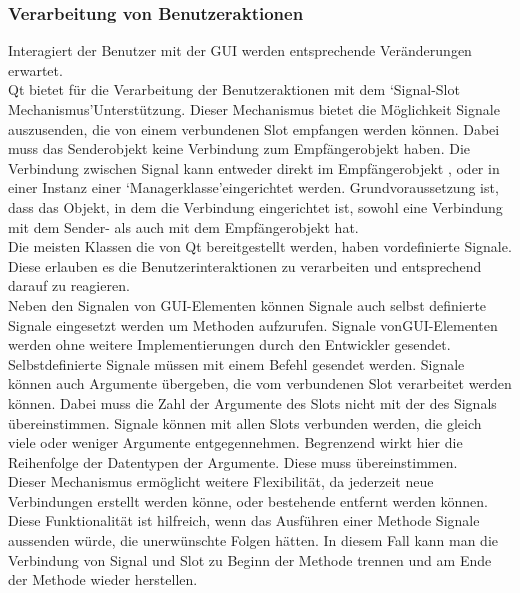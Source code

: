 \documentclass[12pt,a4paper]{article}
\begin{document}
\subsubsection{Verarbeitung von Benutzeraktionen}
Interagiert der Benutzer mit der \ac{GUI} werden entsprechende Veränderungen erwartet. \\
Qt bietet für die Verarbeitung der Benutzeraktionen mit dem \lq Signal-Slot Mechanismus\rq\space Unterstützung. Dieser Mechanismus bietet die Möglichkeit Signale auszusenden, die von einem verbundenen Slot empfangen werden können. Dabei muss das Senderobjekt keine Verbindung zum Empfängerobjekt haben. Die Verbindung zwischen Signal kann entweder direkt im Empfängerobjekt , oder in einer Instanz einer \lq Managerklasse\rq\space eingerichtet werden. Grundvoraussetzung ist, dass das Objekt, in dem die Verbindung eingerichtet ist, sowohl eine Verbindung mit dem Sender- als auch mit dem Empfängerobjekt hat.\\
Die meisten Klassen die von Qt bereitgestellt werden, haben vordefinierte Signale. Diese erlauben es die Benutzerinteraktionen zu verarbeiten und entsprechend darauf zu reagieren. \\
Neben den Signalen von \ac{GUI}-Elementen können Signale auch selbst definierte Signale eingesetzt werden um Methoden aufzurufen. Signale von\ac{GUI}-Elementen werden ohne weitere Implementierungen durch den Entwickler gesendet. Selbstdefinierte Signale müssen mit einem Befehl gesendet werden. Signale können auch Argumente übergeben, die vom verbundenen Slot verarbeitet werden können. Dabei muss die Zahl der Argumente des Slots nicht mit der des Signals übereinstimmen. Signale können mit allen Slots verbunden werden, die gleich viele oder weniger Argumente entgegennehmen. Begrenzend wirkt hier die Reihenfolge der Datentypen der Argumente. Diese muss übereinstimmen.\\
Dieser Mechanismus ermöglicht weitere Flexibilität, da jederzeit neue Verbindungen erstellt werden könne, oder bestehende entfernt werden können. Diese Funktionalität ist hilfreich, wenn das Ausführen einer Methode Signale aussenden würde, die unerwünschte Folgen hätten. In diesem Fall kann man die Verbindung von Signal und Slot zu Beginn der Methode trennen und am Ende der Methode wieder herstellen. \\
\end{document}
